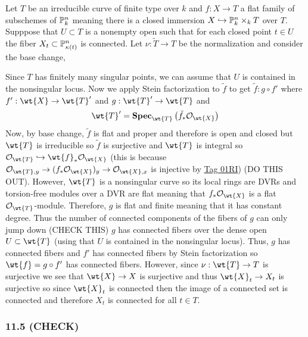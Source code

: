 \documentclass[12pt]{article}
\begin{document}
Let $T$ be an irreducible curve of finite type over $k$ and $f : X \to T$ a flat family of subschemes of $\P^n_k$ meaning there is a closed immersion $X \embed \P^n_k \times_k T$ over $T$. Supppose that $U \subset T$ is a nonempty open such that for each closed point $t \in U$ the fiber $X_t \subset \P^n_{\kappa(t)}$ is connected.
Let $\nu : \tilde{T} \to T$ be the normalization and consider the base change,
\begin{center}
\end{center}
Since $T$ has finitely many singular points, we can assume that $U$ is contained in the nonsingular locus. Now we apply Stein factorization to $\tilde{f}$ to get $\tilde{f} : g \circ f'$ where $f' : \wt{X} \to \wt{T}'$ and $g : \wt{T}' \to \wt{T}$ and
\[ \wt{T}' = \rSpec{\wt{T}}{\tilde{f}_* \struct{\wt{X}}} \]
Now, by base change, $\tilde{f}$ is flat and proper and therefore is open and closed but $\wt{T}$ is irreducible so $\tilde{f}$ is surjective and $\wt{T}$ is integral so $\struct{\wt{T}} \embed \wt{f}_* \struct{\wt{X}}$ (this is because $\stalk{\wt{T}}{y} \to (f_* \struct{\wt{X}})_y \to \stalk{\wt{X}}{x}$ is injective by \href{https://stacks.math.columbia.edu/tag/01RI}{Tag 01RI}) (DO THIS OUT). However, $\wt{T}$ is a nonsingular curve so its local rings are DVRs and torsion-free modules over a DVR are flat meaning that $f_* \struct{\wt{X}}$ is a flat $\struct{\wt{T}}$-module. Therefore, $g$ is flat and finite meaning that it has constant degree. Thus the number of connected components of the fibers of $g$ can only jump down (CHECK THIS) $g$ has connected fibers over the dense open $U \subset \wt{T}$ (using that $U$ is contained in the nonsingular locus). Thus, $g$ has connected fibers and $f'$ has connected fibers by Stein factorization so $\wt{f} = g \circ f'$ has connected fibers. However, since $\nu : \wt{T} \to T$ is surjective we see that $\wt{X} \to X$ is surjective and thus $\wt{X}_t \to X_t$ is surjective so since $\wt{X}_t$ is connected then the image of a connected set is connected and therefore $X_t$ is connected for all $t \in T$.


\subsubsection{11.5 (CHECK)}
\end{document}
